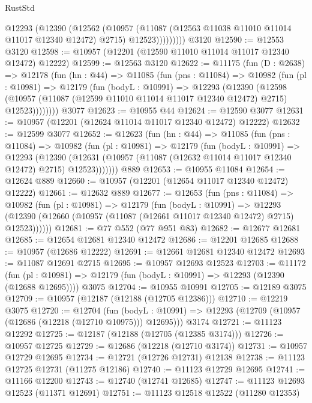 \begin{lexlean}{RustStd}
\begin{coremodule}
              @12293
                (@12390
                  (@12562
                    (@10957
                      (@11087 (@12563 @11038 @11010 @11014 @11017 @12340 @12472) @2715)
                      @12523)))))))))
    @3120
@12590 := @12553 @3120
@12598 := @10957 (@12201 (@12590 @11010 @11014 @11017 @12340 @12472) @12222)
@12599 := @12563 @3120
@12622 := @11175
    (fun (D : @2638) =>
    @12178
      (fun (hn : @44) =>
      @11085
        (fun (pns : @11084) =>
        @10982
          (fun (pl : @10981) =>
          @12179
            (fun (bodyL : @10991) =>
            @12293
              (@12390
                (@12598
                  (@10957 (@11087 (@12599 @11010 @11014 @11017 @12340 @12472) @2715) @12523))))))))
    @3077
@12623 := @10955 @44
@12624 := @12590 @3077
@12631 := @10957 (@12201 (@12624 @11014 @11017 @12340 @12472) @12222)
@12632 := @12599 @3077
@12652 := @12623
    (fun (hn : @44) =>
    @11085
      (fun (pns : @11084) =>
      @10982
        (fun (pl : @10981) =>
        @12179
          (fun (bodyL : @10991) =>
          @12293
            (@12390
              (@12631 (@10957 (@11087 (@12632 @11014 @11017 @12340 @12472) @2715) @12523)))))))
    @889
@12653 := @10955 @11084
@12654 := @12624 @889
@12660 := @10957 (@12201 (@12654 @11017 @12340 @12472) @12222)
@12661 := @12632 @889
@12677 := @12653
    (fun (pns : @11084) =>
    @10982
      (fun (pl : @10981) =>
      @12179
        (fun (bodyL : @10991) =>
        @12293 (@12390 (@12660 (@10957 (@11087 (@12661 @11017 @12340 @12472) @2715) @12523))))))
@12681 := @77 @552 (@77 @951 @83)
@12682 := @12677 @12681
@12685 := @12654 @12681 @12340 @12472
@12686 := @12201 @12685
@12688 := @10957 (@12686 @12222)
@12691 := @12661 @12681 @12340 @12472
@12693 := @11087 @12691 @2715
@12695 := @10957 @12693 @12523
@12703 := @11172
    (fun (pl : @10981) => @12179 (fun (bodyL : @10991) => @12293 (@12390 (@12688 @12695))))
    @3075
@12704 := @10955 @10991
@12705 := @12189 @3075
@12709 := @10957 (@12187 (@12188 (@12705 @12386)))
@12710 := @12219 @3075
@12720 := @12704
    (fun (bodyL : @10991) => @12293 (@12709 (@10957 (@12686 (@12218 (@12710 @10975))) @12695)))
    @3174
@12721 := @11123 @12292
@12725 := @12187 (@12188 (@12705 (@12385 @3174)))
@12726 := @10957 @12725
@12729 := @12686 (@12218 (@12710 @3174))
@12731 := @10957 @12729 @12695
@12734 := @12721 (@12726 @12731) @12138
@12738 := @11123 @12725 @12731 (@11275 @12186)
@12740 := @11123 @12729 @12695
@12741 := @11166 @12200
@12743 := @12740 (@12741 @12685)
@12747 := @11123 @12693 @12523 (@11371 @12691)
@12751 := @11123 @12518 @12522 (@11280 @12353)

\end{coremodule}
\end{lexlean}
